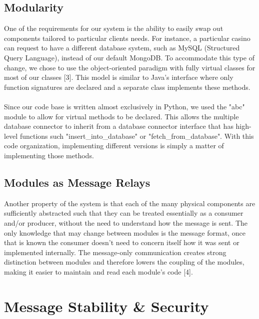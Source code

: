 \documentclass[12pt]{report}
\begin{document}
\subsection*{Modularity}
One of the requirements for our system is the ability to easily swap out components tailored to particular clients needs. For instance, a particular casino can request to have a different database system, such as MySQL (Structured Query Language), instead of our default MongoDB. To accommodate this type of change, we chose to use the object-oriented paradigm with fully virtual classes for most of our classes [3]. This model is similar to Java's interface where only function signatures are declared and a separate class implements these methods. \\ \\
Since our code base is written almost exclusively in Python, we used the "abc" module to allow for virtual methods to be declared. This allows the multiple database connector to inherit from a database connector interface that has high-level functions such "insert\_into\_database" or "fetch\_from\_database". With this code organization, implementing different versions is simply a matter of implementing those methods.

\subsection*{Modules as Message Relays}
Another property of the system is that each of the many physical components are sufficiently abstracted such that they can be treated essentially as a consumer and/or producer, without the need to understand how the message is sent. The only knowledge that may change between modules is the message format, once that is known the consumer doesn't need to concern itself how it was sent or implemented internally. The message-only communication creates strong distinction between modules and therefore lowers the coupling of the modules, making it easier to maintain and read each module's code [4].

\newpage\thispagestyle{fancy}\sectionfont{\scshape}
\section*{Message Stability \& Security}
\end{document}
